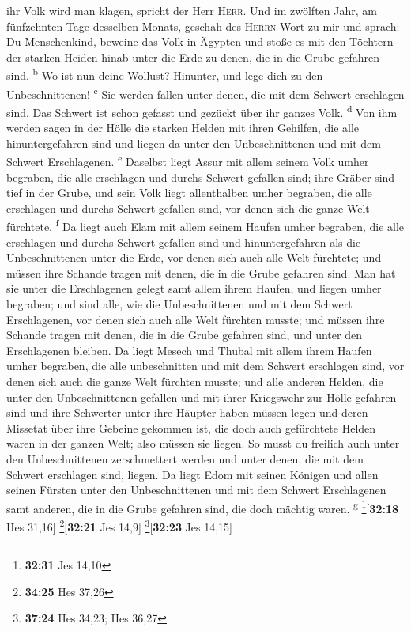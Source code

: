 ihr Volk wird man klagen, spricht der Herr \textsc{Herr}.
 Und im zwölften Jahr, am fünfzehnten Tage desselben
Monats, geschah des \textsc{Herrn} Wort zu mir und sprach:
 Du Menschenkind, beweine das Volk in Ägypten und stoße
es mit den Töchtern der starken Heiden hinab unter die Erde zu denen,
die in die Grube gefahren sind. \textsuperscript{b}  Wo
ist nun deine Wollust? Hinunter, und lege dich zu den Unbeschnittenen!
\textsuperscript{c}  Sie werden fallen unter denen, die
mit dem Schwert erschlagen sind. Das Schwert ist schon gefasst und
gezückt über ihr ganzes Volk. \textsuperscript{d}  Von
ihm werden sagen in der Hölle die starken Helden mit ihren Gehilfen, die
alle hinuntergefahren sind und liegen da unter den Unbeschnittenen und
mit dem Schwert Erschlagenen. \textsuperscript{e} 
Daselbst liegt Assur mit allem seinem Volk umher begraben, die alle
erschlagen und durchs Schwert gefallen sind;  ihre Gräber
sind tief in der Grube, und sein Volk liegt allenthalben umher begraben,
die alle erschlagen und durchs Schwert gefallen sind, vor denen sich die
ganze Welt fürchtete. \textsuperscript{f}  Da liegt auch
Elam mit allem seinem Haufen umher begraben, die alle erschlagen und
durchs Schwert gefallen sind und hinuntergefahren als die
Unbeschnittenen unter die Erde, vor denen sich auch alle Welt fürchtete;
und müssen ihre Schande tragen mit denen, die in die Grube gefahren
sind.  Man hat sie unter die Erschlagenen gelegt samt
allem ihrem Haufen, und liegen umher begraben; und sind alle, wie die
Unbeschnittenen und mit dem Schwert Erschlagenen, vor denen sich auch
alle Welt fürchten musste; und müssen ihre Schande tragen mit denen, die
in die Grube gefahren sind, und unter den Erschlagenen bleiben.
 Da liegt Mesech und Thubal mit allem ihrem Haufen umher
begraben, die alle unbeschnitten und mit dem Schwert erschlagen sind,
vor denen sich auch die ganze Welt fürchten musste;  und
alle anderen Helden, die unter den Unbeschnittenen gefallen und mit
ihrer Kriegswehr zur Hölle gefahren sind und ihre Schwerter unter ihre
Häupter haben müssen legen und deren Missetat über ihre Gebeine gekommen
ist, die doch auch gefürchtete Helden waren in der ganzen Welt; also
müssen sie liegen.  So musst du freilich auch unter den
Unbeschnittenen zerschmettert werden und unter denen, die mit dem
Schwert erschlagen sind, liegen.  Da liegt Edom mit
seinen Königen und allen seinen Fürsten unter den Unbeschnittenen und
mit dem Schwert Erschlagenen samt anderen, die in die Grube gefahren
sind, die doch mächtig waren. \textsuperscript{g}
\footnote{\textbf{32:31} Jes 14,10}{[}\textbf{32:18} Hes 31,16{]}
\footnote{\textbf{34:25} Hes 37,26}{[}\textbf{32:21} Jes 14,9{]}
\footnote{\textbf{37:24} Hes 34,23; Hes 36,27}{[}\textbf{32:23} Jes
14,15{]}

